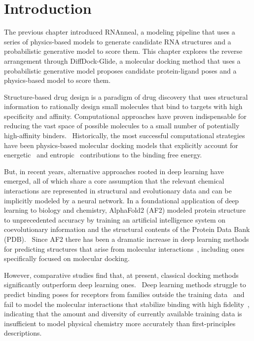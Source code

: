 
%

 

\section{Introduction}
The previous chapter introduced RNAnneal, a modeling pipeline that uses a series of physics-based models to generate candidate RNA structures and a probabilistic generative model to score them. This chapter explores the reverse arrangement through DiffDock-Glide, a molecular docking method that uses a probabilistic generative model proposes candidate protein-ligand poses and a physics-based model to score them.

Structure-based drug design is a paradigm of drug discovery that uses structural information to rationally design small molecules that bind to targets with high specificity and affinity. \cite{anderson2003process} Computational approaches have proven indispensable for reducing the vast space of possible molecules to a small number of potentially high-affinity binders.~\cite{shoichet2004virtual,pagadala2017software,klarich2024thompson} Historically, the most successful computational strategies have been physics-based molecular docking models that explicitly account for energetic~\cite{trott2010autodock,verdonk2003gold,friesner2004glide,allen2015dock} and entropic~\cite{murphy2016wscore} contributions to the binding free energy. 

But, in recent years, alternative approaches rooted in deep learning have emerged, all of which share a core assumption that the relevant chemical interactions are represented in structural and evolutionary data and can be implicitly modeled by a neural network. In a foundational application of deep learning to biology and chemistry, AlphaFold2 (AF2) modeled protein structure to unprecedented accuracy by training an artificial intelligence system on coevolutionary information and the structural contents of the Protein Data Bank (PDB).~\cite{alphafold-2} Since AF2 there has been a dramatic increase in deep learning methods for predicting structures that arise from molecular interactions~\cite{RF-AA,alphafold-3}, including ones specifically focused on molecular docking. \cite{diffdock,qiao2024neuralplexer} 

However, comparative studies find that, at present, classical docking methods significantly outperform deep learning ones.~\cite{buttenschoen2024posebusters} Deep learning methods struggle to predict binding poses for receptors from families outside the training data~\cite{buttenschoen2024posebusters} and fail to model the molecular interactions that stabilize binding with high fidelity~\cite{errington2024plif}, indicating that the amount and diversity of currently available training data is insufficient to model physical chemistry more accurately than first-principles descriptions.

